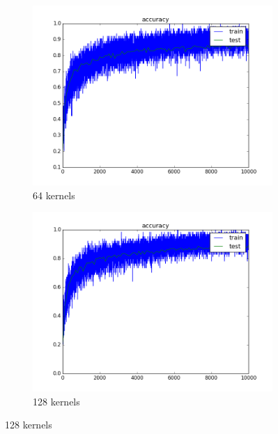 \documentclass{article}
\begin{document}
\begin{enumerate}
\begin{enumerate}
\begin{item}
		\end{item}
		
		
		
		\begin{item}
		\begin{figure}
		\centering
			\begin{subfigure}[b]{0.45\textwidth}
				\includegraphics[width=\textwidth]{figures/accuracy_64kernels}
				\caption{64 kernels}
				\label{fig:64kern}
			\end{subfigure}	
			\quad
			\begin{subfigure}[b]{0.45\textwidth}
				\includegraphics[width=\textwidth]{figures/accuracy_128kernels}
				\caption{128 kernels}
				\label{fig:128kern}
			\end{subfigure}	

\end{figure}
\end{item}
\end{enumerate}
\end{enumerate}
\end{document}
